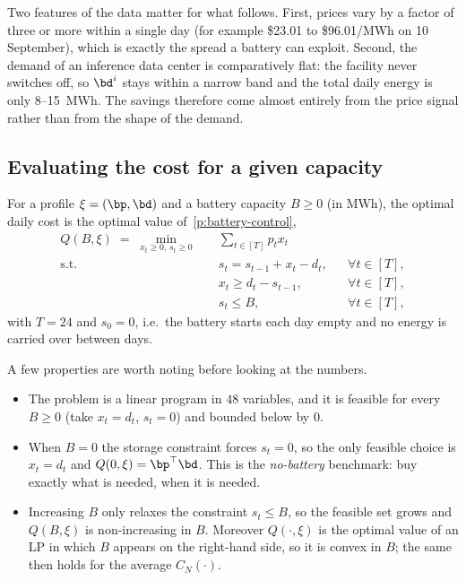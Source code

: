 Two features of the data matter for what follows. First, prices vary by a factor
of three or more within a single day (for example \$23.01 to \$96.01/MWh on
10 September), which is exactly the spread a battery can exploit. Second, the
demand of an inference data center is comparatively flat: the facility never
switches off, so $\bd^i$ stays within a narrow band and the total daily energy is
only 8--15~MWh. The savings therefore come almost entirely from the price signal
rather than from the shape of the demand.

\subsection{Evaluating the cost for a given capacity}

For a profile $\xi = (\bp, \bd)$ and a battery capacity $B \ge 0$ (in MWh), the
optimal daily cost is the optimal value of~\eqref{p:battery-control},
\begin{subequations}
\label{p:Q}
\begin{align}
    Q(B,\xi) \;=\; \min_{x_t \ge 0,\, s_t \ge 0} \quad & \sum_{t\in[T]} p_t x_t\\
    \text{s.t.}\quad & s_t = s_{t-1} + x_t - d_t, && \forall t\in[T],\\
                     & x_t \ge d_t - s_{t-1},     && \forall t\in[T],\\
                     & s_t \le B,                 && \forall t\in [T],
\end{align}
\end{subequations}
with $T=24$ and $s_0 = 0$, i.e.\ the battery starts each day empty and no energy
is carried over between days.

A few properties are worth noting before looking at the numbers.
\begin{itemize}
  \item The problem is a linear program in $48$ variables, and it is feasible for
        every $B\ge 0$ (take $x_t = d_t$, $s_t = 0$) and bounded below by $0$.
  \item When $B=0$ the storage constraint forces $s_t = 0$, so the only feasible
        choice is $x_t = d_t$ and $Q(0,\xi) = \bp^\top \bd$. This is the
        \emph{no-battery} benchmark: buy exactly what is needed, when it is needed.
  \item Increasing $B$ only relaxes the constraint $s_t \le B$, so the feasible set
        grows and $Q(B,\xi)$ is non-increasing in $B$. Moreover $Q(\cdot,\xi)$ is
        the optimal value of an LP in which $B$ appears on the right-hand side, so
        it is convex in $B$; the same then holds for the average $C_N(\cdot)$.
\end{itemize}

